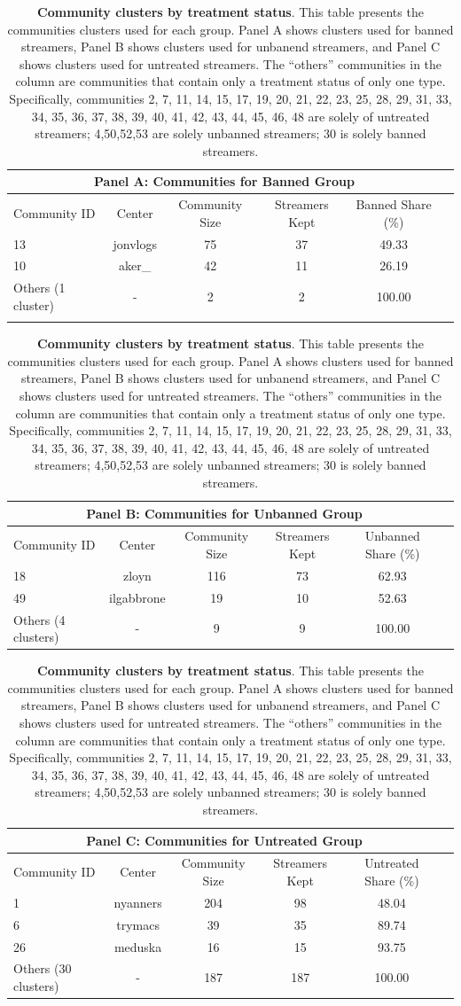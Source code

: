 \documentclass[a4paper,12pt]{article}
\begin{document}
\begin{table}[!htb]
\centering
\renewcommand{\arraystretch}{1.2}
\begin{threeparttable}

\begin{tabular}{lccccc}
\hline 
\multicolumn{5}{c}{Panel A: Communities for Banned Group} \\
\hline
Community ID & Center & Community Size & Streamers Kept & Banned Share (\%) \\
\midrule
13 & jonvlogs  & 75 & 37 & 49.33 \\ %
10 & aker\_ & 42 & 11 & 26.19 \\
Others (1 cluster) & - & 2 & 2  & 100.00 \\
\hline 
\label{table_cluster_panel_a}
\end{tabular}

\begin{tabular}{lccccc}
\hline 
\multicolumn{5}{c}{Panel B: Communities for Unbanned Group} \\
\hline
Community ID & Center & Community Size & Streamers Kept & Unbanned Share (\%) \\
\midrule
18 & zloyn & 116 & 73 &  62.93 \\
49 & ilgabbrone & 19 & 10 & 52.63 \\
Others (4 clusters) & - & 9 & 9  & 100.00 \\
\hline 
\end{tabular}

\vspace{0.5cm}
\begin{tabular}{lccccc}
\hline 
\multicolumn{5}{c}{Panel C: Communities for Untreated Group} \\ \hline
Community ID & Center & Community Size & Streamers Kept & Untreated Share (\%) \\
\midrule
1 & nyanners & 204 & 98 & 48.04 \\
6 & trymacs & 39 & 35 & 89.74\\
26 & meduska & 16 & 15 & 93.75 \\
Others (30 clusters) & - & 187 & 187  & 100.00 \\
\hline 
\end{tabular}
\end{threeparttable}
\caption{\textbf{Community clusters by treatment status}. This table presents the communities clusters used for each group. Panel A shows clusters used for banned streamers, Panel B shows clusters used for unbanend streamers, and Panel C shows clusters used for untreated streamers. The ``others'' communities in the column are communities that contain only a treatment status of only one type. Specifically, communities 2,  7, 11, 14, 15, 17, 19, 20, 21, 22, 23, 25, 28, 29, 31, 33, 34, 35, 36, 37, 38, 39, 40, 41, 42, 43, 44, 45, 46, 48 are solely of untreated streamers; 4,50,52,53 are solely unbanned streamers; 30 is solely banned streamers.}
\label{table:used-communities}
\end{table}
\end{document}
